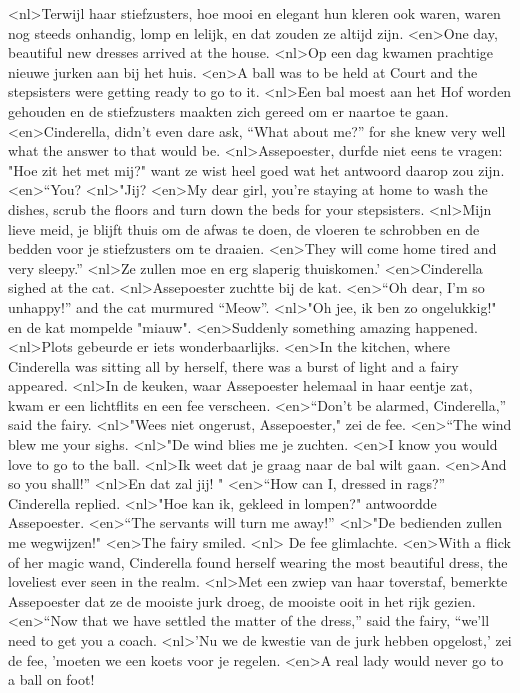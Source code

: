 <nl>Terwijl haar stiefzusters, hoe mooi en elegant hun kleren ook waren, waren nog steeds onhandig, lomp en lelijk, en dat zouden ze altijd zijn.
<en>One day, beautiful new dresses arrived at the house.
<nl>Op een dag kwamen  prachtige nieuwe jurken aan bij het huis.
<en>A ball was to be held at Court and the stepsisters were getting ready to go to it.
<nl>Een bal moest aan het Hof worden gehouden en de stiefzusters maakten zich gereed om er naartoe te gaan.
<en>Cinderella, didn’t even dare ask, “What about me?” for she knew very well what the answer to that would be.
<nl>Assepoester, durfde niet eens te vragen: "Hoe zit het met mij?" want ze wist heel goed wat het antwoord daarop zou zijn.
<en>“You?
<nl>"Jij?
<en>My dear girl, you’re staying at home to wash the dishes, scrub the floors and turn down the beds for your stepsisters.
<nl>Mijn lieve meid, je blijft thuis om de afwas te doen, de vloeren te schrobben en de bedden voor je stiefzusters om te draaien.
<en>They will come home tired and very sleepy.” 
<nl>Ze zullen moe en erg slaperig thuiskomen.'
<en>Cinderella sighed at the cat.
<nl>Assepoester zuchtte bij de kat.
<en>“Oh dear, I’m so unhappy!” and the cat murmured “Meow”.
<nl>"Oh jee, ik ben zo ongelukkig!" en de kat mompelde "miauw".
<en>Suddenly something amazing happened.
<nl>Plots gebeurde er iets wonderbaarlijks.
<en>In the kitchen, where Cinderella was sitting all by herself, there was a burst of light and a fairy appeared.
<nl>In de keuken, waar Assepoester helemaal in haar eentje zat, kwam er een lichtflits en een fee verscheen.
<en>“Don’t be alarmed, Cinderella,” said the fairy.
<nl>"Wees niet ongerust, Assepoester," zei de fee.
<en>“The wind blew me your sighs.
<nl>"De wind blies me je zuchten.
<en>I know you would love to go to the ball.
<nl>Ik weet dat je graag naar de bal wilt gaan.
<en>And so you shall!”
<nl>En dat zal jij! "
<en>“How can I, dressed in rags?” Cinderella replied.
<nl>"Hoe kan ik, gekleed in lompen?" antwoordde Assepoester.
<en>“The servants will turn me away!” 
<nl>"De bedienden zullen me wegwijzen!"
<en>The fairy smiled.
<nl> De fee glimlachte.
<en>With a flick of her magic wand, Cinderella found herself wearing the most beautiful dress, the loveliest ever seen in the realm.
<nl>Met een zwiep van haar toverstaf, bemerkte Assepoester dat ze de mooiste jurk droeg, de mooiste  ooit in het rijk gezien.
<en>“Now that we have settled the matter of the dress,” said the fairy, “we’ll need to get you a coach.
<nl>'Nu we de kwestie van de jurk hebben opgelost,' zei de fee, 'moeten we een koets voor je regelen.
<en>A real lady would never go to a ball on foot!
